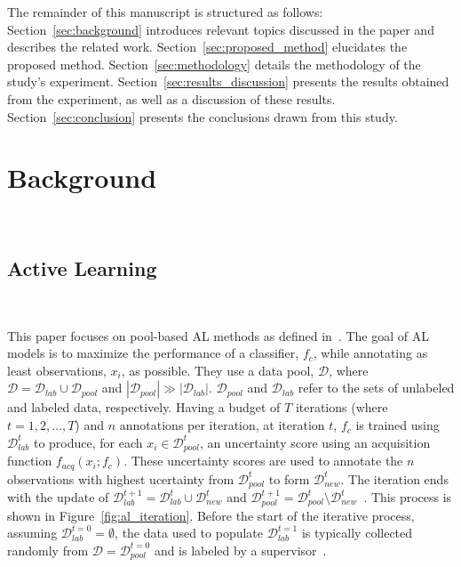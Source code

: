 \documentclass[parskip=full]{scrartcl}
\begin{document}
The remainder of this manuscript is structured as follows:
Section~\ref{sec:background} introduces relevant topics discussed in the paper
and describes the related work. Section~\ref{sec:proposed_method} elucidates
the proposed method. Section~\ref{sec:methodology} details the methodology of
the study's experiment. Section~\ref{sec:results_discussion} presents the
results obtained from the experiment, as well as a discussion of these
results. Section~\ref{sec:conclusion} presents the conclusions drawn from
this study.
 
\section{Background}~\label{sec:background}

\subsection{Active Learning}~\label{sec:active_learning_methods}

This paper focuses on pool-based AL methods as defined
in~\cite{katz2021improved}. The goal of AL models is to maximize the
performance of a classifier, $f_{c}$, while annotating as least observations,
$x_i$, as possible. They use a data pool, $\mathcal{D}$, where $\mathcal{D} =
\mathcal{D}_{lab} \cup \mathcal{D}_{pool}$ and $|\mathcal{D}_{pool}| \gg
|\mathcal{D}_{lab}|$. $\mathcal{D}_{pool}$ and $\mathcal{D}_{lab}$ refer to
the sets of unlabeled and labeled data, respectively. Having a budget of $T$
iterations (where $t = 1, 2, \ldots, T$) and $n$ annotations per iteration, at
iteration $t$, $f_c$ is trained using $\mathcal{D}_{lab}^t$ to produce, for
each $x_i \in \mathcal{D}_{pool}^t$, an uncertainty score using an acquisition
function $f_{acq}(x_i;f_c)$. These uncertainty scores are used to annotate the
$n$ observations with highest ucertainty from $\mathcal{D}_{pool}^t$ to form
$\mathcal{D}_{new}^t$. The iteration ends with the update of
$\mathcal{D}_{lab}^{t+1} = \mathcal{D}_{lab}^t \cup \mathcal{D}_{new}^t$ and
$\mathcal{D}_{pool}^{t+1} = \mathcal{D}_{pool}^t \setminus
\mathcal{D}_{new}^t$~\cite{Su2020, Sverchkov2017}. This process is shown in
Figure~\ref{fig:al_iteration}. Before the start of the iterative process,
assuming $\mathcal{D}_{lab}^{t=0} = \emptyset$, the data used to populate
$\mathcal{D}_{lab}^{t=1}$ is typically collected randomly from $\mathcal{D} =
\mathcal{D}_{pool}^{t=0}$ and is labeled by a supervisor~\cite{Fonseca2021,
Yoo2019, Aghdam2019}. 
\end{document}
